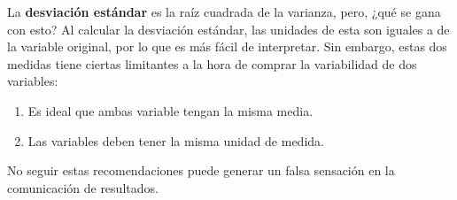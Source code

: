 \documentclass[
  11pt,
]{book}
\providecommand{\tightlist}{%
  \setlength{\itemsep}{0pt}\setlength{\parskip}{0pt}}
\theoremstyle{definition}
\theoremstyle{definition}
\theoremstyle{definition}
\theoremstyle{definition}
\theoremstyle{remark}
\begin{document}
La \textbf{desviación estándar} es la raíz cuadrada de la varianza, pero, ¿qué se gana con esto? Al calcular la desviación estándar, las unidades de esta son iguales a de la variable original, por lo que es más fácil de interpretar. Sin embargo, estas dos medidas tiene ciertas limitantes a la hora de comprar la variabilidad de dos variables:

\begin{enumerate}
\def\labelenumi{\arabic{enumi}.}
\tightlist
\item
  Es ideal que ambas variable tengan la misma media.
\item
  Las variables deben tener la misma unidad de medida.
\end{enumerate}

No seguir estas recomendaciones puede generar un falsa sensación en la comunicación de resultados.
\end{document}
